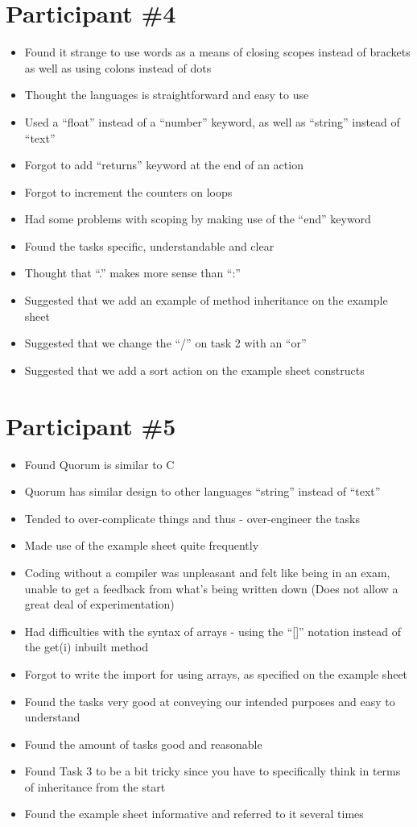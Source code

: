 \section{Participant {\#}4}
\begin{itemize}
\item Found it strange to use words as a means of closing scopes instead of brackets as well as using colons instead of dots
\item Thought the languages is straightforward and easy to use
\item Used a “float” instead of a “number” keyword, as well as “string” instead of “text”
\item Forgot to add “returns” keyword at the end of an action
\item Forgot to increment the counters on loops
\item Had some problems with scoping by making use of the “end” keyword
\item Found the tasks specific, understandable and clear
\item Thought that “.” makes more sense than “:”
\item Suggested that we add an example of method inheritance on the example sheet
\item Suggested that we change the “/” on task 2 with an “or”
\item Suggested that we add a sort action on the example sheet
 constructs
\end{itemize}
\section{Participant {\#}5}
\begin{itemize}
\item Found Quorum is similar to C
\item Quorum has similar design to other languages “string” instead of “text”
\item Tended to over-complicate things and thus - over-engineer the tasks
\item Made use of the example sheet quite frequently
\item Coding without a compiler was unpleasant and felt like being in an exam, unable to get a feedback from what’s being written down (Does not allow a great deal of experimentation)
\item Had difficulties with the syntax of arrays - using the “[]” notation instead of the get(i) inbuilt method
\item Forgot to write the import for using arrays, as specified on the example sheet
\item Found the tasks very good at conveying our intended purposes and easy to understand
\item Found the amount of tasks good and reasonable
\item Found Task 3 to be a bit tricky since you have to specifically think in terms of inheritance from the start
\item Found the example sheet informative and referred to it several times
\end{itemize}
